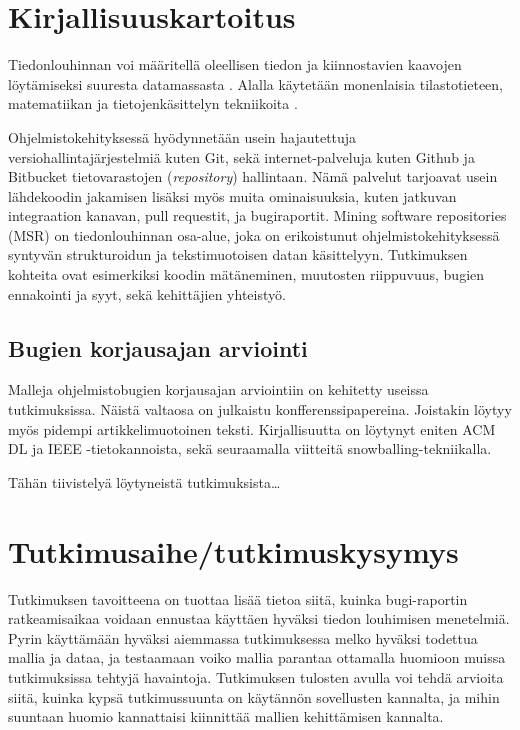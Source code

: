 \documentclass[utf8]{gradu3}
\begin{document}
\chapter{Kirjallisuuskartoitus}


Tiedonlouhinnan voi määritellä oleellisen tiedon ja kiinnostavien kaavojen
löytämiseksi suuresta datamassasta \parencite[][8]{han-data_mining}. Alalla
käytetään monenlaisia tilastotieteen, matematiikan ja tietojenkäsittelyn
tekniikoita \parencite{clifton-2019}. 

Ohjelmistokehityksessä hyödynnetään usein hajautettuja
versiohallintajärjestelmiä kuten Git, sekä internet-palveluja kuten Github ja
Bitbucket tietovarastojen (\textit{repository}) hallintaan. Nämä palvelut
tarjoavat usein lähdekoodin jakamisen lisäksi myös muita ominaisuuksia, kuten
jatkuvan integraation kanavan, pull requestit, ja bugiraportit. Mining software
repositories (MSR) on tiedonlouhinnan osa-alue, joka on erikoistunut
ohjelmistokehityksessä syntyvän strukturoidun ja tekstimuotoisen datan
käsittelyyn. Tutkimuksen kohteita ovat esimerkiksi koodin mätäneminen, muutosten
riippuvuus, bugien ennakointi ja syyt, sekä kehittäjien yhteistyö.
\parencite{guemes-pena-emerging_topics}

\section{Bugien korjausajan arviointi}
Malleja ohjelmistobugien korjausajan arviointiin on kehitetty useissa
tutkimuksissa. Näistä valtaosa on julkaistu konfferenssipapereina. Joistakin
löytyy myös pidempi artikkelimuotoinen teksti. Kirjallisuutta on löytynyt eniten
ACM DL ja IEEE -tietokannoista, sekä seuraamalla viitteitä
snowballing-tekniikalla. 

Tähän tiivistelyä löytyneistä tutkimuksista\dots
\parencite[Esim.]{Lamkanfi-2012,ardimento-2020,lee-2020} %

\chapter{Tutkimusaihe/tutkimuskysymys}
Tutkimuksen tavoitteena on tuottaa lisää tietoa siitä, kuinka bugi-raportin
ratkeamisaikaa voidaan ennustaa käyttäen hyväksi tiedon louhimisen menetelmiä.
Pyrin käyttämään hyväksi aiemmassa tutkimuksessa \parencite{riivo-2016} melko
hyväksi todettua mallia ja dataa, ja testaamaan voiko mallia parantaa ottamalla
huomioon muissa tutkimuksissa tehtyjä havaintoja. Tutkimuksen tulosten avulla
voi tehdä arvioita siitä, kuinka kypsä tutkimussuunta on käytännön sovellusten
kannalta, ja mihin suuntaan huomio kannattaisi kiinnittää mallien kehittämisen
kannalta.
\end{document}
